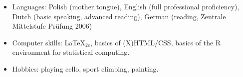 \documentclass[a4paper,12pt]{article}
\begin{document}
\begin{small}
  \begin{itemize}
  \item Languages: Polish (mother tongue), English (full professional proficiency), Dutch
    (basic speaking, advanced reading), German (reading, Zentrale
    Mittelstufe Pr\"ufung 2006)
  \item Computer skills: \LaTeX$_{2e}$, basics of
    (X)HTML/CSS, basics of the R environment for statistical
    computing.

  \item Hobbies: playing cello, sport climbing, painting.
  \end{itemize}


\end{small}
\end{document}

